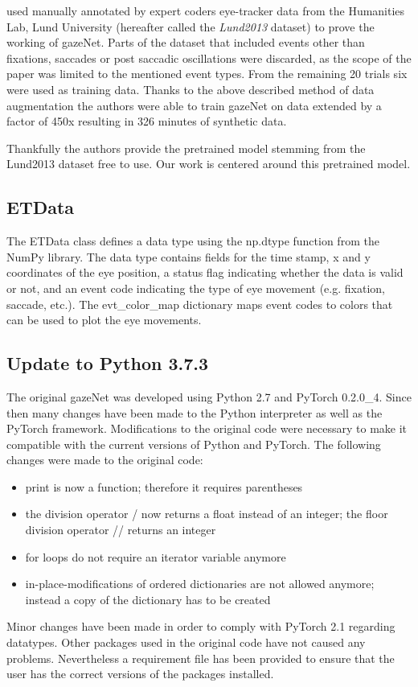 \documentclass[conference]{IEEEtran}
\begin{document}
\cite{zemblys2018gazeNet} used manually annotated by expert coders eye-tracker data from the Humanities Lab, Lund University (hereafter called the \emph{Lund2013} dataset) to prove the working of gazeNet. Parts of the dataset that included events other than fixations, saccades or post saccadic oscillations were discarded, as the scope of the paper was limited to the mentioned event types. From the remaining 20 trials six were used as training data. Thanks to the above described method of data augmentation the authors were able to train gazeNet on data extended by a factor of 450x resulting in 326 minutes of synthetic data.

Thankfully the authors provide the pretrained model stemming from the Lund2013 dataset free to use. Our work is centered around this pretrained model.

\subsection{ETData}
The ETData class defines a data type using the np.dtype function from the NumPy library. The data type contains fields for the time stamp, x and y coordinates of the eye position, a status flag indicating whether the data is valid or not, and an event code indicating the type of eye movement (e.g. fixation, saccade, etc.). The evt\_color\_map dictionary maps event codes to colors that can be used to plot the eye movements.


\subsection{Update to Python 3.7.3}
The original gazeNet was developed using Python 2.7 and PyTorch 0.2.0\_4. Since then many changes have been made to the Python interpreter as well as the PyTorch framework. Modifications to the original code were necessary to make it compatible with the current versions of Python and PyTorch. The following changes were made to the original code:
\begin{itemize}
    \item print is now a function; therefore it requires parentheses
    \item the division operator / now returns a float instead of an integer; the floor division operator // returns an integer
    \item for loops do not require an iterator variable anymore
    \item in-place-modifications of ordered dictionaries are not allowed anymore; instead a copy of the dictionary has to be created
\end{itemize}
Minor changes have been made in order to comply with PyTorch 2.1 regarding datatypes. Other packages used in the original code have not caused any problems. Nevertheless a requirement file has been provided to ensure that the user has the correct versions of the packages installed.
\end{document}
